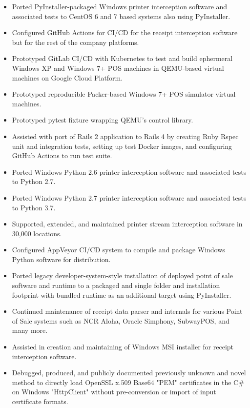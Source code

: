 \documentclass[10pt,letter,ragged2e]{altacv}
\begin{document}
\begin{paracol}{2}


\begin{itemize}
\item Ported PyInstaller-packaged Windows printer interception software and associated tests to CentOS 6 and 7 based systems also using PyInstaller.
\item Configured GitHub Actions for CI/CD for the receipt interception software but for the rest of the company platforms.
\item Prototyped GitLab CI/CD with Kubernetes to test and build ephermeral Windows XP and Windows 7+ POS machines in QEMU-based virtual machines on Google Cloud Platform. 
\item Prototyped reproducible Packer-based Windows 7+ POS simulator virtual machines.
\item Prototyped pytest fixture wrapping QEMU's control library. 
\item Assisted with port of Rails 2 application to Rails 4 by creating Ruby Rspec unit and integration tests, setting up test Docker images, and configuring GitHub Actions to run test suite.
\item Ported Windows Python 2.6 printer interception software and associated tests to Python 2.7.
\item Ported Windows Python 2.7 printer interception software and associated tests to Python 3.7.
\item Supported, extended, and maintained printer stream interception software in 30,000 locations.
\item Configured AppVeyor CI/CD system to compile and package Windows Python software for distribution.
\item Ported legacy developer-system-style installation of deployed point of sale software and runtime to a packaged and single folder and installation footprint with bundled runtime as an additional target using PyInstaller.
\item Continued maintenance of receipt data parser and internals for various Point of Sale systems such as NCR Aloha, Oracle Simphony, SubwayPOS, and many more.
\item Assisted in creation and maintaining of Windows MSI installer for receipt interception software.
\item Debugged, produced, and publicly documented previously unknown and novel method to directly load OpenSSL x.509 Base64 "PEM" certificates in the C\# on Windows "HttpClient" without pre-conversion or import of input certificate formats.

\end{itemize}
\end{paracol}
\end{document}
